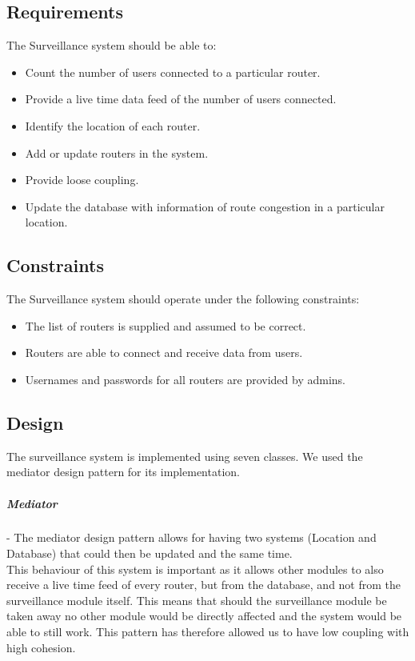 \documentclass[english]{article}
\begin{document}
        \subsection{Requirements}
        The Surveillance system should be able to:
            \begin{itemize}
                \item Count the number of users connected to a particular router.
                \item Provide a live time data feed of the number of users connected.
                \item Identify the location of each router.
                \item Add or update routers in the system.
                \item Provide loose coupling.
                \item Update the database with information of route congestion in a particular location.
            \end{itemize}
    
        \subsection{Constraints}
        The Surveillance system should operate under the following constraints:
            \begin{itemize}
                \item The list of routers is supplied and assumed to be correct.
                \item Routers are able to connect and receive data from users.
                \item Usernames and passwords for all routers are provided by admins.
            \end{itemize}
        
        \subsection{Design}    
            The surveillance system is implemented using seven classes. We used the mediator design pattern for its implementation.
    
            \subparagraph{Mediator} - The mediator design pattern allows for having two systems (Location and Database) that could then be updated and the same time. \\
            
            This behaviour of this system is important as it allows other modules to also receive a live time feed of every router, but from the database, and not from the surveillance module itself.
            This means that should the surveillance module be taken away no other module would be directly affected and the system would be able to still work. This pattern has therefore allowed us to have low coupling with high cohesion.
    
\end{document}
